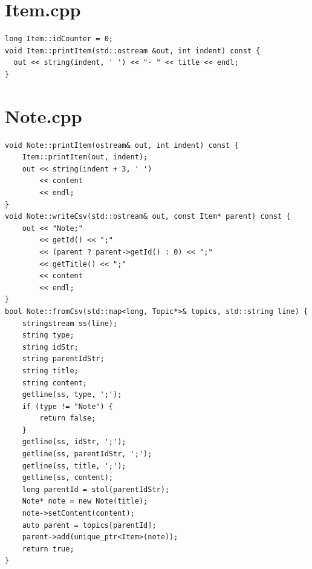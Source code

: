 \documentclass[8pt,twocolumn]{extarticle}
\begin{document}
\section*{Item.cpp}
\begin{lstlisting}
long Item::idCounter = 0;
void Item::printItem(std::ostream &out, int indent) const {
  out << string(indent, ' ') << "- " << title << endl;
}
\end{lstlisting}

\section*{Note.cpp}
\begin{lstlisting}
void Note::printItem(ostream& out, int indent) const {
    Item::printItem(out, indent);
    out << string(indent + 3, ' ')
        << content
        << endl;
}
void Note::writeCsv(std::ostream& out, const Item* parent) const {
    out << "Note;"
        << getId() << ";"
        << (parent ? parent->getId() : 0) << ";"
        << getTitle() << ";"
        << content
        << endl;
}
bool Note::fromCsv(std::map<long, Topic*>& topics, std::string line) {
    stringstream ss(line);
    string type;
    string idStr;
    string parentIdStr;
    string title;
    string content;
    getline(ss, type, ';');
    if (type != "Note") {
        return false;
    }
    getline(ss, idStr, ';');
    getline(ss, parentIdStr, ';');
    getline(ss, title, ';');
    getline(ss, content);
    long parentId = stol(parentIdStr);
    Note* note = new Note(title);
    note->setContent(content);
    auto parent = topics[parentId];
    parent->add(unique_ptr<Item>(note));
    return true;
}
\end{lstlisting}
\end{document}
